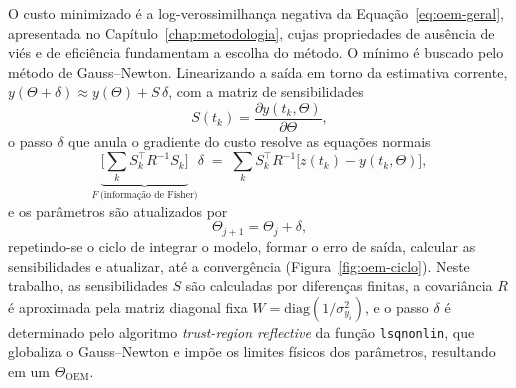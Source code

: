 {\color{blue}O custo minimizado é a log-verossimilhança negativa da Equação~\eqref{eq:oem-geral}, apresentada no Capítulo~\ref{chap:metodologia}, cujas propriedades de ausência de viés e de eficiência fundamentam a escolha do método.} O mínimo é buscado pelo método de Gauss--Newton. Linearizando a saída em torno da estimativa corrente, $y(\Theta + \delta) \approx y(\Theta) + S\,\delta$, com a matriz de sensibilidades
\begin{equation}
S(t_k) = \frac{\partial y(t_k,\Theta)}{\partial \Theta},
\label{eq:sens}
\end{equation}
o passo $\delta$ que anula o gradiente do custo resolve as equações normais
\begin{equation}
\underbrace{\Bigg[\textstyle\sum_{k} S_k^\top R^{-1} S_k\Bigg]}_{\textstyle F\ \text{(informação de Fisher)}} \delta \;=\; \sum_{k} S_k^\top R^{-1}\big[z(t_k) - y(t_k,\Theta)\big],
\label{eq:gauss-newton}
\end{equation}
e os parâmetros são atualizados por
\begin{equation}
\Theta_{j+1} = \Theta_j + \delta,
\label{eq:update}
\end{equation}
repetindo-se o ciclo de integrar o modelo, formar o erro de saída, calcular as sensibilidades e atualizar, até a convergência (Figura~\ref{fig:oem-ciclo}). Neste trabalho, as sensibilidades $S$ são calculadas por diferenças finitas, a covariância $R$ é aproximada pela matriz diagonal fixa $W = \mathrm{diag}(1/\sigma_{y_i}^2)$, e o passo $\delta$ é determinado pelo algoritmo \textit{trust-region reflective} da função \texttt{lsqnonlin}, que globaliza o Gauss--Newton e impõe os limites físicos dos parâmetros, resultando em um $\Theta_{\text{OEM}}$.

